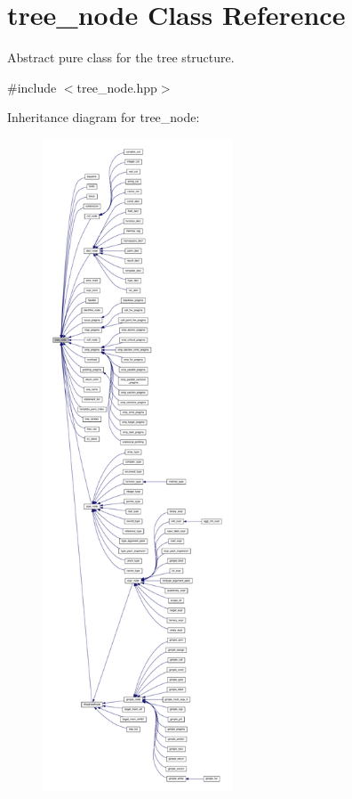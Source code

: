 \hypertarget{classtree__node}{}\section{tree\+\_\+node Class Reference}
\label{classtree__node}


Abstract pure class for the tree structure.  




{\ttfamily \#include $<$tree\+\_\+node.\+hpp$>$}



Inheritance diagram for tree\+\_\+node\+:
\nopagebreak
\begin{figure}[H]
\begin{center}
\leavevmode
\includegraphics[height=550pt]{d8/d59/classtree__node__inherit__graph}
\end{center}
\end{figure}
